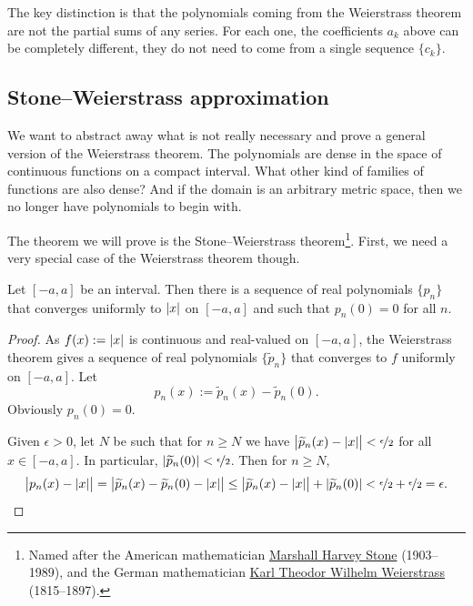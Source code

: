 The key distinction is that
the polynomials coming from the Weierstrass theorem are not the partial
sums of any series.  For each one, the coefficients $a_k$ above can be
completely different, they do not need to come from a single sequence $\{
c_k \}$.

\subsection{Stone--Weierstrass approximation}

We want to abstract away what is not really
necessary and prove a general version of the Weierstrass theorem.
The polynomials are dense in the space of continuous
functions on a compact interval.  What other kind of families of
functions are also dense?  And if the domain is an
arbitrary metric space, then we no longer have polynomials
to begin with.

The theorem we will prove is the Stone--Weierstrass theorem\footnote{%
Named after the American mathematician
\href{https://en.wikipedia.org/wiki/Marshall_Harvey_Stone}{Marshall Harvey Stone}
(1903--1989), and the German mathematician
\href{https://en.wikipedia.org/wiki/Karl_Weierstrass}{Karl Theodor Wilhelm Weierstrass}
(1815--1897).}.
First,
we need a very
special case of the Weierstrass theorem though.

\begin{cor}
Let $[-a,a]$ be an interval.  Then there is a sequence of real polynomials
$\{ p_n \}$ that converges uniformly to $\lvert {x} \rvert$ on $[-a,a]$ and such that
$p_n(0) = 0$ for all $n$.
\end{cor}

\begin{proof}
As $f(x) := \lvert {x} \rvert$ is continuous and real-valued
on $[-a,a]$, the Weierstrass theorem gives a sequence of
real polynomials $\{ \widetilde{p}_n \}$ that converges to $f$
uniformly on $[-a,a]$.
Let
\begin{equation*}
p_n(x) := \widetilde{p}_n(x) - \widetilde{p}_n(0) .
\end{equation*}
Obviously $p_n(0) = 0$.

Given $\epsilon > 0$, let $N$ be such that
for $n \geq N$ we have
$\bigl\lvert\widetilde{p}_n(x)-\lvert {x} \rvert\big\rvert <
\nicefrac{\epsilon}{2}$ for all $x \in [-a,a]$.
In particular,
$\lvert {\widetilde{p}_n(0)} \rvert < \nicefrac{\epsilon}{2}$.
Then for $n \geq N$,
\begin{equation*}
\bigl\lvert p_n(x)-\lvert {x} \rvert \bigr\rvert
=
\bigl\lvert \widetilde{p}_n(x) - \widetilde{p}_n(0) - \lvert {x} \rvert \bigr\rvert
\leq
\bigl\lvert \widetilde{p}_n(x) - \lvert {x} \rvert \bigr\rvert + \lvert {\widetilde{p}_n(0)} \rvert < 
\nicefrac{\epsilon}{2} + \nicefrac{\epsilon}{2} = \epsilon . \qedhere
\end{equation*}
\end{proof}

